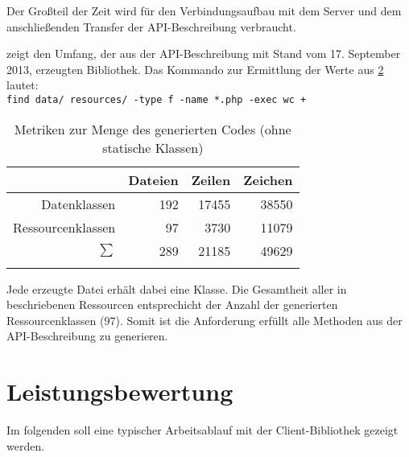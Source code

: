Der Großteil der Zeit wird für den Verbindungsaufbau mit dem Server und dem anschließenden Transfer der \gls{API}-Beschreibung verbraucht.

 zeigt den Umfang, der aus der \gls{API}-Beschreibung mit Stand vom 17. September 2013, erzeugten Bibliothek.
Das Kommando zur Ermittlung der Werte aus \cref{tab:code_metrics} lautet:\\
\texttt{find data/ resources/ -type f -name *.php -exec wc {} +}

\begin{table}
    \begin{longtable}{r r r r}
        \toprule
        \rowcolor{lightgray}
                          & \textbf{Dateien}  & \textbf{Zeilen}     & \textbf{Zeichen}\\
        \midrule
        Datenklassen      & 192               & 17455               & 38550\\
        Ressourcenklassen & 97                & 3730                & 11079\\        
        \midrule
        $\sum$            & 289               & 21185               & 49629\\
        \bottomrule
        \caption{Metriken zur Menge des generierten Codes (ohne statische Klassen)}
        \label{tab:code_metrics}
    \end{longtable} 
\end{table}

Jede erzeugte Datei erhält dabei eine Klasse. Die Gesamtheit aller in \cite{WADL} beschriebenen Ressourcen entsprechicht der Anzahl der generierten Ressourcenklassen (97). Somit ist die Anforderung erfüllt alle Methoden aus der \gls{API}-Beschreibung zu generieren.

\section{Leistungsbewertung}
\label{sec:performance_measurement}


Im folgenden soll eine typischer Arbeitsablauf mit der Client-Bibliothek gezeigt werden. 

